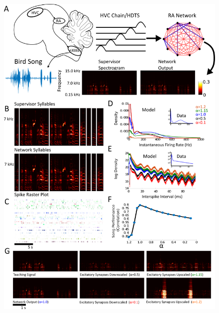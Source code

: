 \documentclass[11pt]{article} %
\begin{document}
\begin{figure}[htp!]
\centering
\includegraphics[scale=0.88]{FFIG4}
\caption{}\label{FORCE5}
\end{figure}
\end{document}
